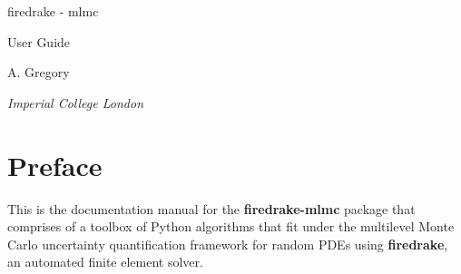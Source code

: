 \documentclass[10pt,letterpaper,extrafontsizes]{memoir}
\newcommand\svnidlong[4]{}
\begin{document}





\firmlists
\midsloppy
\raggedbottom
{}




\frontmatter
\pagestyle{empty}


\vspace*{\fill}
\begin{center}
\HUGE\textsf{firedrake - mlmc}\par
\end{center}
\bigskip
\begin{center}
\Huge\textsf{User Guide}\par
\end{center}
\bigskip
\begin{center}
\LARGE\textsf{A. Gregory}\par
\bigskip
\normalsize\textsf{\textit{Imperial College London}}\par
\medskip
\end{center}
\vspace*{\fill}
\def\THP{T\kern-0.2em H\kern-0.4em P}%
\def\THP{T\kern-0.15em H\kern-0.3em P}%

\clearpage



\endgroup

\cleardoublepage

\pagestyle{headings}

\clearpage
\tableofcontents
\setlength{\unitlength}{1pt}




\svnidlong
{$Ignore: $}
{$LastChangedDate: 2014-11-05 16:28:11 +0100 (Wed, 05 Nov 2014) $}
{$LastChangedRevision: 501 $}
{$LastChangedBy: daleif $}

\chapter{Preface}


    This is the documentation manual for the \textbf{firedrake-mlmc} package that comprises of a toolbox of Python algorithms that fit under the multilevel Monte Carlo uncertainty quantification framework for random PDEs using \textbf{firedrake}, an automated finite element solver.\\
    
\end{document}
